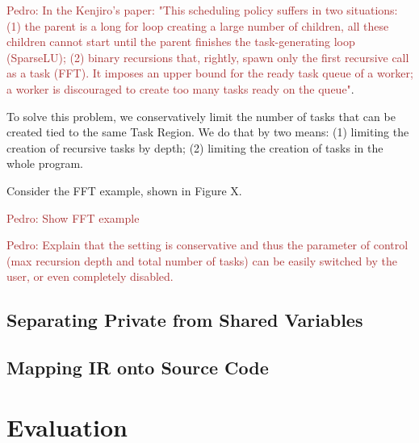 \documentclass[sigplan,10pt,review,anonymous]{acmart}
\newcommand{\pedro}[1]{\noindent\textcolor{brown}{Pedro: {#1}}}
\newcommand{\pedro}[1]{}
\begin{document}
\pedro{In the Kenjiro's paper: "This scheduling policy suffers in two situations: 
(1) the parent is a long for loop creating a large number of children, 
all these children cannot start until the parent finishes the task-generating loop (SparseLU); 
(2) binary recursions that, rightly, spawn only the first recursive call as a task (FFT). 
It imposes an upper bound for the ready task queue of a worker; a worker 
is discouraged to create too many tasks ready on the queue"}.

To solve this problem, we conservatively limit the number of tasks
that can be created tied to the same Task Region. We do that by two means:
(1) limiting the creation of recursive tasks by depth; (2) limiting the creation of 
tasks in the whole program.

Consider the FFT example, shown in Figure X.

\pedro{Show FFT example}

\pedro{Explain that the setting is conservative and thus the parameter of control
(max recursion depth and total number of tasks) can be easily switched by the
user, or even completely disabled.}


\subsection{Separating Private from Shared Variables}
\label{sub:variance}

\subsection{Mapping IR onto Source Code}
\label{sub:ir}




\section{Evaluation}
\label{sec:eval}
\end{document}
